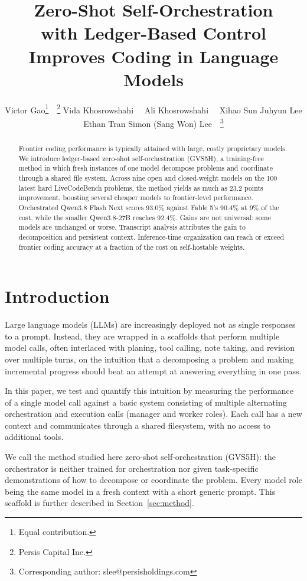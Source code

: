 \documentclass{article}
\title{Zero-Shot Self-Orchestration \\
with Ledger-Based Control \\
Improves Coding in Language Models}
\author{%
  Victor Gao\thanks{Equal contribution.}\ \ \thanks{Persis Capital Inc.} \quad
  Vida Khosrowshahi\footnotemark[1]\ \ \footnotemark[2] \quad
  Ali Khosrowshahi\footnotemark[1]\ \ \footnotemark[2] \AND
  Xihao Sun\footnotemark[2] \quad
  Juhyun Lee \quad
  Ethan Tran\footnotemark[2] \quad
  Simon (Sang Won) Lee\footnotemark[2]\ \ \thanks{Corresponding author:
  slee@persisholdings.com}
}
\begin{document}
\maketitle

\begin{abstract}
Frontier coding performance is typically attained with large, costly proprietary models. We introduce ledger-based zero-shot self-orchestration (GVS5H), a training-free method in which fresh instances of one model decompose problems and coordinate through a shared file system. 
Across nine open and closed-weight models on the 100 latest hard LiveCodeBench problems, 
the method yields as much as 23.2 points improvement, boosting several cheaper models to frontier-level performance. 
Orchestrated Qwen3.8 Flash Next scores 93.0\% against Fable 5's 90.4\% at 9\% of the cost, while the smaller Qwen3.8-27B reaches 92.4\%. 
Gains are not universal: some models are unchanged or worse. Transcript analysis attributes the gain to decomposition and persistent context. 
Inference-time organization can reach or exceed frontier coding accuracy at a fraction of the cost on self-hostable weights.
\end{abstract}

\section{Introduction}
\label{sec:intro}

Large language models (LLMs) are increasingly deployed not as single responses to a prompt. Instead, they are wrapped in a scaffolds that perform multiple model calls, often interlaced with planing, tool calling, note taking,
and revision over multiple turns, on the intuition that a decomposing a problem and making incremental progress should beat an attempt at answering everything in one pass.

In this paper, we test and quantify this intuition by measuring the performance of a single model call against a basic system consisting of multiple alternating orchestration and execution calls (manager and worker roles). Each call has a new context and communicates through a shared filesystem, with no access to additional tools.
 
We call the method studied here zero-shot self-orchestration (GVS5H): the orchestrator is neither trained for orchestration nor
given task-specific demonstrations of how to decompose or coordinate the problem. Every model role being the same model in a fresh context
with a short generic prompt. This scaffold is further described in Section~\ref{sec:method}.
\end{document}
